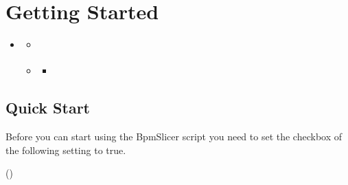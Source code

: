 \documentclass[a4paper,11pt,openany,oneside,english]{sphinxmanual}
\begin{document}
\section{Getting Started}
\label{\detokenize{getting_started/getting_started:getting-started}}\label{\detokenize{getting_started/getting_started::doc}}
\begin{sphinxShadowBox}
\begin{itemize}
\item {} 
\label{\detokenize{getting_started/getting_started:id1}}{\hyperref[\detokenize{getting_started/getting_started:getting-started}]{}}
\begin{itemize}
\item {} 
\label{\detokenize{getting_started/getting_started:id2}}{\hyperref[\detokenize{getting_started/getting_started:quick-start}]{}}

\item {} 
\label{\detokenize{getting_started/getting_started:id3}}{\hyperref[\detokenize{getting_started/getting_started:section-1}]{}}
\begin{itemize}
\item {} 
\label{\detokenize{getting_started/getting_started:id4}}{\hyperref[\detokenize{getting_started/getting_started:section-2}]{}}

\end{itemize}

\end{itemize}

\end{itemize}
\end{sphinxShadowBox}


\subsection{Quick Start}
\label{\detokenize{getting_started/getting_started:quick-start}}
Before you can start using the BpmSlicer script you need to set the checkbox of the following setting to true.

()

\begin{figure}[htbp]
\centering

\noindent{}
\end{figure}
\end{document}
